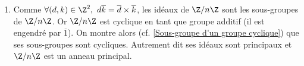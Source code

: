 \documentclass[8pt]{book}
\begin{document}
\begin{enumerate}[leftmargin=*]
		\begin{itemize}
			\item Si $a\in C\cap\{1,2,4,5,8\}$ alors $\displaystyle\frac{1}{a}\in \D$ d'où $1\in I$ puis $I=\D$ par absorbance.
			\item Si $6\in C$ alors $3=6\times\displaystyle\frac{1}{2}\in I$ donc $6\D=3\D$.
		\end{itemize}
		Finalement les seuls idéaux de $\D$ sont $\{0\},\ 3\D,\ 7\D,\ 9\D$ et $\D$.
		\item Comme $\forall (d,k)\in \Z^2,\ d\overline k=\overline d\times\overline k$, les idéaux de $\Z/n\Z$ sont les sous-groupes de $\Z/n\Z$. Or $\Z/n\Z$ est cyclique en tant que groupe additif (il est engendré par $\overline 1$). On montre alors (cf. \ref{Sous-groupe d'un groupe cyclique}) que ses sous-groupes sont cycliques. Autrement dit ses idéaux sont principaux et $\Z/n\Z$ est un anneau principal.
	\end{enumerate}
	
\end{document}
